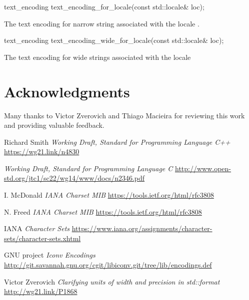\documentclass{wg21}
\begin{document}
\begin{addedblock}

\begin{itemdecl}
text_encoding text_encoding_for_locale(const std::locale& loc);
\end{itemdecl}

\begin{itemdescr}
    \returns The text encoding for narrow string associated with the locale .
\end{itemdescr}

\begin{itemdecl}
text_encoding text_encoding_wide_for_locale(const std::locale& loc);
\end{itemdecl}

\begin{itemdescr}
    \returns The text encoding for wide strings associated with the locale 
\end{itemdescr}
\end{addedblock}


\section{Acknowledgments}

Many thanks to Victor Zverovich and Thiago Macieira for reviewing this work and providing valuable feedback.

 
\begin{thebibliography}{9}
    
    Richard Smith
    \emph{Working Draft, Standard for Programming Language C++}\newline
    \url{https://wg21.link/n4830}
    
    
    \emph{Working Draft, Standard for Programming Language C}\newline
    \url{ http://www.open-std.org/jtc1/sc22/wg14/www/docs/n2346.pdf}
    
    
   
    
    I. McDonald
    \emph{IANA Charset MIB}\newline
    \url{https://tools.ietf.org/html/rfc3808}
    
    N. Freed
    \emph{IANA Charset MIB}\newline
    \url{https://tools.ietf.org/html/rfc3808}
    
    IANA
    \emph{Character Sets}\newline
    \url{https://www.iana.org/assignments/character-sets/character-sets.xhtml}
    
    
    GNU project
    \emph{Iconv Encodings}\newline
    \url{http://git.savannah.gnu.org/cgit/libiconv.git/tree/lib/encodings.def}
    
    Victor Zverovich
    \emph{Clarifying units of width and precision in std::format}\newline
    \url{http://wg21.link/P1868}
    

    
\end{thebibliography}
\end{document}
